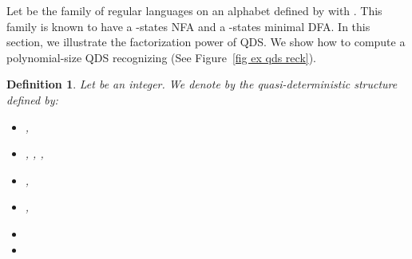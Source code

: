 \documentclass[11pt]{elsarticle}
\newtheorem{definition}{Definition}
\begin{document}
Let  be the family of regular languages on an alphabet    defined by  with . This family is known to have a -states NFA and a 
-states minimal DFA.
In this section, we illustrate the factorization power of QDS. We show how to compute a polynomial-size QDS   recognizing  (See  Figure~\ref{fig ex qds reck}).



\begin{definition}
  Let  be an integer. We denote by  the quasi-deterministic structure  defined by:
  \begin{itemize}
    \item , \item , , ,
\item ,
    \item ,
    \item 
    \item 
  \end{itemize}
\end{definition}
\end{document}
